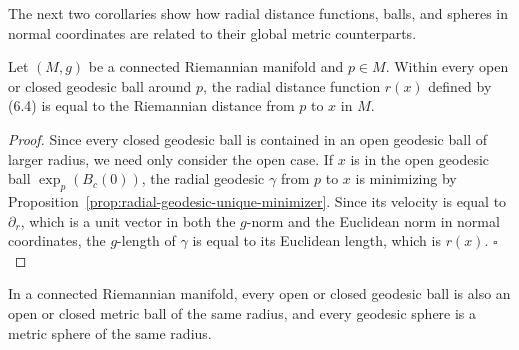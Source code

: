The next two corollaries show how radial distance functions, balls, and spheres in normal coordinates are related to their global metric counterparts.

\begin{corollary}
\label{cor:radial-distance-riemannian-distance}

Let $(M, g)$ be a connected Riemannian manifold and $p \in M$. Within every open or closed geodesic ball around $p$, the radial distance function $r(x)$ defined by (6.4) is equal to the Riemannian distance from $p$ to $x$ in $M$.
\end{corollary}

\begin{proof}
Since every closed geodesic ball is contained in an open geodesic ball of larger radius, we need only consider the open case. If $x$ is in the open geodesic ball $\exp_p(B_c(0))$, the radial geodesic $\gamma$ from $p$ to $x$ is minimizing by Proposition~\ref{prop:radial-geodesic-unique-minimizer}. Since its velocity is equal to $\partial_r$, which is a unit vector in both the $g$-norm and the Euclidean norm in normal coordinates, the $g$-length of $\gamma$ is equal to its Euclidean length, which is $r(x)$. $\square$
\end{proof}

\begin{corollary}
\label{cor:geodesic-ball-metric-ball}

In a connected Riemannian manifold, every open or closed geodesic ball is also an open or closed metric ball of the same radius, and every geodesic sphere is a metric sphere of the same radius.
\end{corollary}


